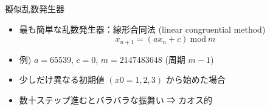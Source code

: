 \begin{frame}[t,fragile]{擬似乱数発生器}
  \begin{itemize}
  \item 最も簡単な乱数発生器：線形合同法 (linear congruential method)
    \[
    x_{n+1} = (ax_n+c) \ \mbox{mod} \ m
    \]
  \item 例) $a = 65539$, $c = 0$, $m = 2147483648$ (周期 $m-1$)
  \item 少しだけ異なる初期値 $(x0 = 1, 2, 3)$ から始めた場合
  \item 数十ステップ進むとバラバラな振舞い ⇒ カオス的
  \end{itemize}
\end{frame}
